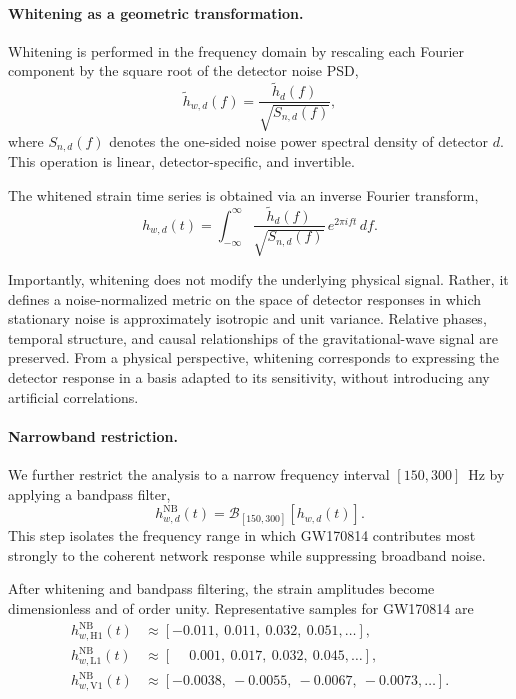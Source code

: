 \documentclass[11pt,a4paper]{article}
\begin{document}
\paragraph{Whitening as a geometric transformation.}

Whitening is performed in the frequency domain by rescaling each Fourier component by the square root of the detector noise PSD,
\begin{equation}
\tilde{h}_{w,d}(f) = \frac{\tilde{h}_d(f)}{\sqrt{S_{n,d}(f)}} ,
\end{equation}
where $S_{n,d}(f)$ denotes the one-sided noise power spectral density of detector $d$.
This operation is linear, detector-specific, and invertible.

The whitened strain time series is obtained via an inverse Fourier transform,
\begin{equation}
h_{w,d}(t)
= \int_{-\infty}^{\infty}
\frac{\tilde{h}_d(f)}{\sqrt{S_{n,d}(f)}}
\, e^{2\pi i f t} \, df .
\end{equation}

Importantly, whitening does not modify the underlying physical signal.
Rather, it defines a noise-normalized metric on the space of detector responses in which stationary noise is approximately isotropic and unit variance.
Relative phases, temporal structure, and causal relationships of the gravitational-wave signal are preserved.
From a physical perspective, whitening corresponds to expressing the detector response in a basis adapted to its sensitivity, without introducing any artificial correlations.

\paragraph{Narrowband restriction.}

We further restrict the analysis to a narrow frequency interval $[150,300]$~Hz by applying a bandpass filter,
\begin{equation}
h^{\mathrm{NB}}_{w,d}(t)
= \mathcal{B}_{[150,300]}\!\left[h_{w,d}(t)\right].
\end{equation}
This step isolates the frequency range in which GW170814 contributes most strongly to the coherent network response while suppressing broadband noise.

After whitening and bandpass filtering, the strain amplitudes become dimensionless and of order unity.
Representative samples for GW170814 are
\begin{align}
h^{\mathrm{NB}}_{w,\mathrm{H1}}(t) &\approx [-0.011,\ 0.011,\ 0.032,\ 0.051,\dots], \\
h^{\mathrm{NB}}_{w,\mathrm{L1}}(t) &\approx [\phantom{-}0.001,\ 0.017,\ 0.032,\ 0.045,\dots], \\
h^{\mathrm{NB}}_{w,\mathrm{V1}}(t) &\approx [-0.0038,\ -0.0055,\ -0.0067,\ -0.0073,\dots].
\end{align}
\end{document}
